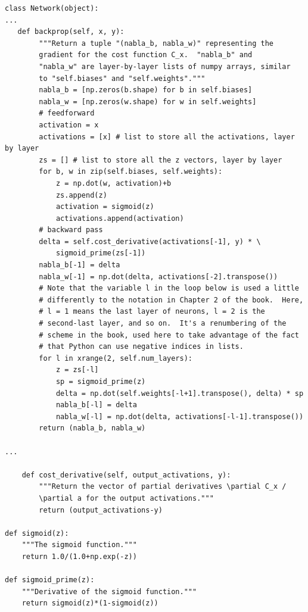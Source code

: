\begin{lstlisting}
class Network(object):
...
   def backprop(self, x, y):
        """Return a tuple "(nabla_b, nabla_w)" representing the
        gradient for the cost function C_x.  "nabla_b" and
        "nabla_w" are layer-by-layer lists of numpy arrays, similar
        to "self.biases" and "self.weights"."""
        nabla_b = [np.zeros(b.shape) for b in self.biases]
        nabla_w = [np.zeros(w.shape) for w in self.weights]
        # feedforward
        activation = x
        activations = [x] # list to store all the activations, layer by layer
        zs = [] # list to store all the z vectors, layer by layer
        for b, w in zip(self.biases, self.weights):
            z = np.dot(w, activation)+b
            zs.append(z)
            activation = sigmoid(z)
            activations.append(activation)
        # backward pass
        delta = self.cost_derivative(activations[-1], y) * \
            sigmoid_prime(zs[-1])
        nabla_b[-1] = delta
        nabla_w[-1] = np.dot(delta, activations[-2].transpose())
        # Note that the variable l in the loop below is used a little
        # differently to the notation in Chapter 2 of the book.  Here,
        # l = 1 means the last layer of neurons, l = 2 is the
        # second-last layer, and so on.  It's a renumbering of the
        # scheme in the book, used here to take advantage of the fact
        # that Python can use negative indices in lists.
        for l in xrange(2, self.num_layers):
            z = zs[-l]
            sp = sigmoid_prime(z)
            delta = np.dot(self.weights[-l+1].transpose(), delta) * sp
            nabla_b[-l] = delta
            nabla_w[-l] = np.dot(delta, activations[-l-1].transpose())
        return (nabla_b, nabla_w)

...

    def cost_derivative(self, output_activations, y):
        """Return the vector of partial derivatives \partial C_x /
        \partial a for the output activations."""
        return (output_activations-y) 

def sigmoid(z):
    """The sigmoid function."""
    return 1.0/(1.0+np.exp(-z))

def sigmoid_prime(z):
    """Derivative of the sigmoid function."""
    return sigmoid(z)*(1-sigmoid(z))

\end{lstlisting}



